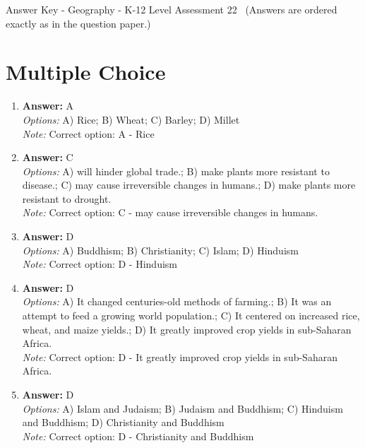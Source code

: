 \documentclass[12pt]{article}
\begin{document}
\begin{center}
Answer Key - Geography - K-12 Level Assessment 22 \
\small (Answers are ordered exactly as in the question paper.)
\end{center}

\section*{Multiple Choice}
\begin{enumerate}[label=\arabic*.]
\item \textbf{Answer:} A
\\ \textit{Options:} A) Rice; B) Wheat; C) Barley; D) Millet
\\ \textit{Note:} Correct option: A - Rice
\item \textbf{Answer:} C
\\ \textit{Options:} A) will hinder global trade.; B) make plants more resistant to disease.; C) may cause irreversible changes in humans.; D) make plants more resistant to drought.
\\ \textit{Note:} Correct option: C - may cause irreversible changes in humans.
\item \textbf{Answer:} D
\\ \textit{Options:} A) Buddhism; B) Christianity; C) Islam; D) Hinduism
\\ \textit{Note:} Correct option: D - Hinduism
\item \textbf{Answer:} D
\\ \textit{Options:} A) It changed centuries-old methods of farming.; B) It was an attempt to feed a growing world population.; C) It centered on increased rice, wheat, and maize yields.; D) It greatly improved crop yields in sub-Saharan Africa.
\\ \textit{Note:} Correct option: D - It greatly improved crop yields in sub-Saharan Africa.
\item \textbf{Answer:} D
\\ \textit{Options:} A) Islam and Judaism; B) Judaism and Buddhism; C) Hinduism and Buddhism; D) Christianity and Buddhism
\\ \textit{Note:} Correct option: D - Christianity and Buddhism
\end{enumerate}
\end{document}
